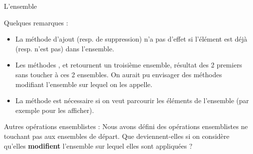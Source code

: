 \begin{Exercice}{L'ensemble}
	\bigskip

	Quelques remarques :
	\begin{itemize}
		\item 
			La méthode d'ajout (resp. de suppression) n'a
			pas d'effet si l'élément est déjà
			(resp. n'est pas) dans l'ensemble.
		\item 
			Les méthodes , 
			 et 
			 retournent un troisième ensemble, 
			résultat des 2 premiers sans toucher
			à ces 2 ensembles. On aurait pu envisager des méthodes modifiant
			l'ensemble sur lequel on les appelle.
		\item 
			La méthode 
			est nécessaire si on veut parcourir les éléments de
			l'ensemble (par exemple pour les afficher).
	\end{itemize}
	
	Autres opérations ensemblistes :
	Nous avons défini des opérations ensemblistes ne touchant pas aux
	ensembles de départ. Que deviennent-elles si on considère
	qu'elles \textbf{modifient}
	l'ensemble sur lequel elles sont appliquées ?
\end{Exercice}

